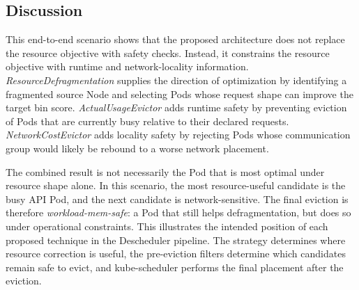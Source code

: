 \subsection{Discussion}

This end-to-end scenario shows that the proposed architecture does not replace the resource objective with safety checks. Instead, it constrains the resource objective with runtime and network-locality information. \textit{ResourceDefragmentation} supplies the direction of optimization by identifying a fragmented source Node and selecting Pods whose request shape can improve the target bin score. \textit{ActualUsageEvictor} adds runtime safety by preventing eviction of Pods that are currently busy relative to their declared requests. \textit{NetworkCostEvictor} adds locality safety by rejecting Pods whose communication group would likely be rebound to a worse network placement.

The combined result is not necessarily the Pod that is most optimal under resource shape alone. In this scenario, the most resource-useful candidate is the busy API Pod, and the next candidate is network-sensitive. The final eviction is therefore \textit{workload-mem-safe}: a Pod that still helps defragmentation, but does so under operational constraints. This illustrates the intended position of each proposed technique in the Descheduler pipeline. The strategy determines where resource correction is useful, the pre-eviction filters determine which candidates remain safe to evict, and kube-scheduler performs the final placement after the eviction.

